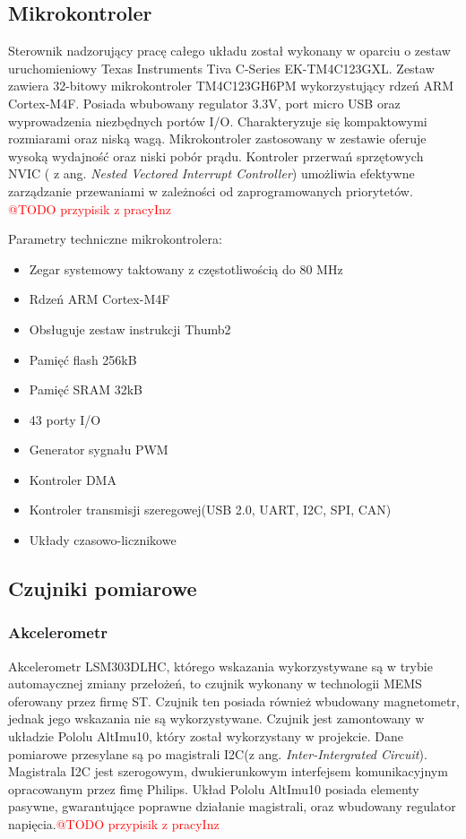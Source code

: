 \subsection{Mikrokontroler}
Sterownik nadzorujący pracę całego układu został wykonany w oparciu o zestaw uruchomieniowy Texas Instruments Tiva C-Series EK-TM4C123GXL. Zestaw zawiera 32-bitowy mikrokontroler TM4C123GH6PM wykorzystujący rdzeń ARM Cortex-M4F. Posiada wbubowany regulator 3.3V, port micro USB oraz wyprowadzenia niezbędnych portów I/O. Charakteryzuje się kompaktowymi rozmiarami oraz niską wagą. Mikrokontroler zastosowany w zestawie 	oferuje wysoką wydajność oraz niski pobór prądu. Kontroler przerwań sprzętowych NVIC ( z ang. {\em Nested Vectored Interrupt Controller}) umożliwia efektywne zarządzanie przewaniami w zależności od zaprogramowanych priorytetów.
\textcolor{red}{@TODO przypisik z pracyInz}

Parametry techniczne mikrokontrolera:
\begin{itemize}
\item
Zegar systemowy taktowany z częstotliwością do 80 MHz
\item
Rdzeń ARM Cortex-M4F
\item 
Obsługuje zestaw instrukcji Thumb2
\item
Pamięć flash 256kB
\item
Pamięć SRAM 32kB
\item
43 porty I/O
\item
Generator sygnału PWM
\item
Kontroler DMA
\item
Kontroler transmisji szeregowej(USB 2.0, UART, I2C, SPI, CAN)
\item
Układy czasowo-licznikowe
\end{itemize} 
\subsection{Czujniki pomiarowe}
\subsubsection{Akcelerometr}
Akcelerometr LSM303DLHC, którego wskazania wykorzystywane są w trybie automaycznej zmiany przełożeń, to czujnik wykonany w technologii MEMS oferowany przez firmę ST. Czujnik ten posiada również wbudowany magnetometr, jednak jego wskazania nie są wykorzystywane. Czujnik jest zamontowany w układzie Pololu AltImu10, który został wykorzystany w projekcie. Dane pomiarowe przesylane są po magistrali I2C(z ang. {\em Inter-Intergrated Circuit}). Magistrala I2C jest szerogowym, dwukierunkowym interfejsem komunikacyjnym opracowanym przez fimę Philips. Układ Pololu AltImu10 posiada elementy pasywne, gwarantujące poprawne działanie magistrali, oraz wbudowany regulator napięcia.\textcolor{red}{@TODO przypisik z pracyInz}
